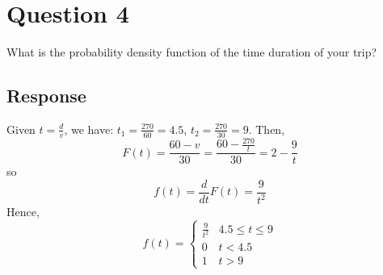 \documentclass[13pt]{article}
\begin{document}
\newpage
\section*{Question 4}
What is the probability density function of the time duration of your trip?

\subsection*{Response}
Given $t = \frac{d}{v}$, we have:
$t_1 = \frac{270}{60} = 4.5$, $t_2 = \frac{270}{30} = 9$. Then,
\[F(t) = \frac{60 - v}{30} = \frac{60 - \frac{270}{t}}{30} = 2 - \frac{9}{t}\]
so
\[f(t) = \frac{d}{dt} F(t) = \frac{9}{t^2}\]
Hence,
\[f(t) =
  \begin{cases}
    \frac{9}{t^2} & 4.5 \leq t \leq 9 \\
    0 & t < 4.5 \\
    1 & t > 9
  \end{cases}
\]
\end{document}
